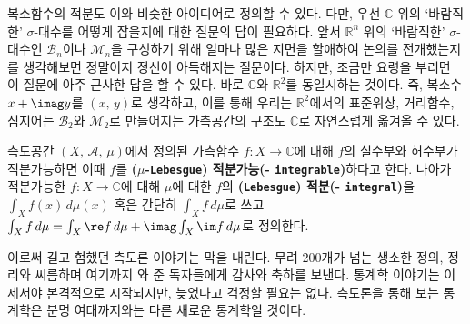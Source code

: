 복소함수의 적분도 이와 비슷한 아이디어로 정의할 수 있다. 다만, 우선 $\mathbb{C}$ 위의 `바람직한' $\sigma$-대수를 어떻게 잡을지에 대한 질문의 답이 필요하다. 앞서 $\mathbb{R}^n$ 위의 `바람직한' $\sigma$-대수인 $\mathcal{B}_n$이나 $\mathcal{M}_n$을 구성하기 위해 얼마나 많은 지면을 할애하여 논의를 전개했는지를 생각해보면 정말이지 정신이 아득해지는 질문이다. 하지만, 조금만 요령을 부리면 이 질문에 아주 근사한 답을 할 수 있다. 바로 $\mathbb{C}$와 $\mathbb{R}^2$를 동일시하는 것이다. 즉, 복소수 $x+\imag y$를 $(x,\,y)$로 생각하고, 이를 통해 우리는 $\mathbb{R}^2$에서의 표준위상, 거리함수, 심지어는 $\mathcal{B}_2$와 $\mathcal{M}_2$로 만들어지는 가측공간의 구조도 $\mathbb{C}$로 자연스럽게 옮겨올 수 있다.

\begin{definition}
    측도공간 $(X,\,\mathcal{A},\,\mu)$에서 정의된 가측함수 $f:X\to\mathbb{C}$에 대해 $f$의 실수부와 허수부가 적분가능하면 이때 $f$를 \textbf{($\mu$-\texttt{Lebesgue}) 적분가능(- \texttt{integrable})}하다고 한다. 나아가 적분가능한 $f:X\to\mathbb{C}$에 대해 $\mu$에 대한 $f$의 \textbf{(\texttt{Lebesgue}) 적분(- \texttt{integral})}을 $\int_Xf(x)\,d\mu(x)$ 혹은 간단히 $\int_Xf\,d\mu$로 쓰고 $\int_Xf\,d\mu=\int_X\re f\,d\mu+\imag\int_X\im f\,d\mu$로 정의한다.
\end{definition}



이로써 길고 험했던 측도론 이야기는 막을 내린다. 무려 200개가 넘는 생소한 정의, 정리와 씨름하며 여기까지 와 준 독자들에게 감사와 축하를 보낸다. 통계학 이야기는 이제서야 본격적으로 시작되지만, 늦었다고 걱정할 필요는 없다. 측도론을 통해 보는 통계학은 분명 여태까지와는 다른 새로운 통계학일 것이다.

